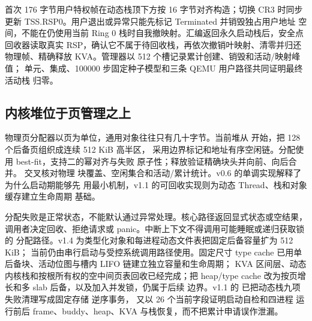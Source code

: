首次 176 字节用户特权帧在动态栈顶下方按 16 字节对齐构造；切换 CR3 时同步
更新 TSS.RSP0。用户退出或异常只能先标记 Terminated 并销毁独占用户地址
空间，不能在仍使用当前 Ring 0 栈时自我撤映射。汇编返回永久启动栈后，安全点
回收器读取真实 RSP，确认它不属于待回收栈，再依次撤销叶映射、清零并归还
物理帧、精确释放 KVA。管理器以 512 个槽记录累计创建、销毁和活动/映射峰值；
单元、集成、100000 步固定种子模型和三条 QEMU 用户路径共同证明最终活动栈
归零。

\subsection{内核堆位于页管理之上}

物理页分配器以页为单位，通用对象往往只有几十字节。当前堆从
 开始，把 128 个后备页组织成连续 512 KiB 高半区，
采用边界标记和地址有序空闲链。分配使用 best-fit，支持二的幂对齐与失败
原子性；释放验证精确块头并向前、向后合并。 交叉核对物理
块覆盖、空闲集合和活动/累计统计。v0.6 的单调实现解释了为什么启动期能够先
用最小机制，v1.1 的可回收实现则为动态 Thread、栈和对象缓存建立生命周期
基础。

分配失败是正常状态，不能默认通过异常处理。核心路径返回显式状态或空结果，
调用者决定回收、拒绝请求或 panic。中断上下文不得调用可能睡眠或递归获取锁的
分配路径。v1.4 为类型化对象和每进程动态文件表把固定后备容量扩为 512 KiB；
当前仍由串行启动与受控系统调用路径使用。固定尺寸
type cache 已用单后备块、活动位图与槽内 LIFO 链建立独立容量和生命周期；
KVA 区间层、动态内核栈和按根所有权的空中间页表回收已经完成；把
heap/type cache 改为按页增长和多 slab 后备，以及加入并发锁，仍属于后续
边界。v1.1 的  已把动态栈九项失败清理写成固定存储
逆序事务， 又以 26 个当前字段证明启动自检和四进程
运行前后 frame、buddy、heap、KVA 与栈恢复，而不把累计申请误作泄漏。
